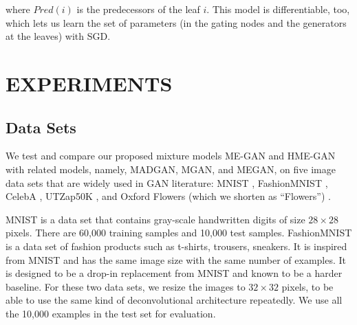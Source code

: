 \documentclass[a4paper,onesided,12pt]{report}
\begin{document}
where $Pred(i)$ is the predecessors of the leaf $i$. This model is differentiable, too, which lets us learn the set of parameters (in the gating nodes and the generators at the leaves) with SGD.
%

\chapter{EXPERIMENTS}
\label{chapter:exps}

\section{Data Sets}
\label{sec:datasets}
We test and compare our proposed mixture models ME-GAN and HME-GAN with related models, namely, MADGAN, MGAN, and MEGAN, on five image data sets that are widely used in GAN literature: MNIST \cite{lecun1998mnist}, FashionMNIST \cite{xiao2017fashion}, CelebA \cite{liu2015deep},  UTZap50K \cite{yu2014fine}, and Oxford Flowers (which we shorten as ``Flowers'') \cite{nilsback2008automated}.

MNIST is a data set that contains gray-scale handwritten digits of size $28 \times 28$ pixels. There are 60,000 training samples and 10,000 test samples. FashionMNIST is a data set of fashion products such as t-shirts, trousers, sneakers. It is inspired from MNIST and has the same image size with the same number of examples. It is designed to be a drop-in replacement from MNIST and known to be a harder baseline. For these two data sets, we resize the images to $32 \times 32$ pixels, to be able to use the same kind of deconvolutional architecture repeatedly. We use all the 10,000 examples in the test set for evaluation.
\end{document}
